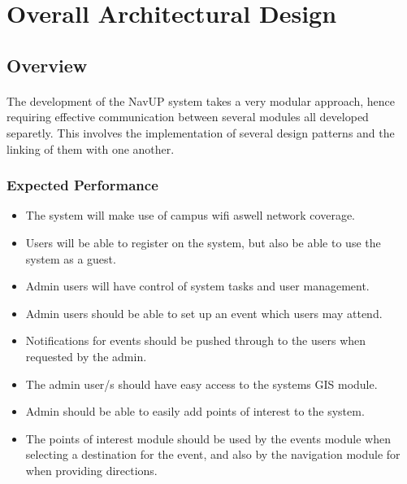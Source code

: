 \documentclass{article}
\begin{document}
\section{Overall Architectural Design}
\subsection{Overview}
\paragraph{}The development of the NavUP system takes a very modular approach, hence requiring effective communication between several modules all developed separetly. This involves the implementation of several design patterns and the linking of them with one another.
\subsubsection{Expected Performance}
\begin{itemize}
	\item The system will make use of campus wifi aswell network coverage.
    \item Users will be able to register on the system, but also be able to use the system as a guest.
    \item Admin users will have control of system tasks and user management.
    \item Admin users should be able to set up an event which users may attend.
    \item Notifications for events should be pushed through to the users when requested by the admin.
    \item The admin user/s should have easy access to the systems GIS module.
    \item Admin should be able to easily add points of interest to the system.
    \item The points of interest module should be used by the events module when selecting a destination 			for the event, and also by the navigation module for when providing directions.
\end{itemize}
\end{document}
